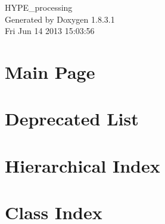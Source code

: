 \documentclass{book}
\begin{document}
\hypersetup{pageanchor=false,citecolor=blue}
\begin{titlepage}
\vspace*{7cm}
\begin{center}
{\Large H\-Y\-P\-E\-\_\-processing }\\
\vspace*{1cm}
{\large Generated by Doxygen 1.8.3.1}\\
\vspace*{0.5cm}
{\small Fri Jun 14 2013 15:03:56}\\
\end{center}
\end{titlepage}
\clearemptydoublepage
{}
\tableofcontents
\clearemptydoublepage
{}
\hypersetup{pageanchor=true,citecolor=blue}
\chapter{Main Page}
\label{index}\hypertarget{index}{}
\chapter{Deprecated List}
\label{deprecated}
\hypertarget{deprecated}{}

\chapter{Hierarchical Index}

\chapter{Class Index}

\end{document}
